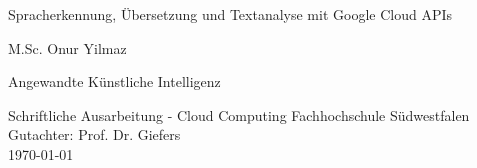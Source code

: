 \documentclass[12pt,a4paper]{article}
\begin{document}
	
		
		\begin{titlepage}
			\begin{center}
				\vspace*{1cm}
				\Huge
				Spracherkennung, Übersetzung und Textanalyse mit Google Cloud APIs
				
				
				\vspace{1.5cm}
				\LARGE
				M.Sc. Onur Yilmaz
				
				\vspace{1.5cm}
				\Large
				Angewandte Künstliche Intelligenz
				
				\vfill
				
				Schriftliche Ausarbeitung - Cloud Computing
				\vspace{0.5cm}
				\large
				Fachhochschule Südwestfalen
				\vspace{0.8cm}
				\Large
				\\
				Gutachter: Prof. Dr. Giefers
				\\
				\vspace{0.5cm}
				\large		
				\today
			\end{center}
		\end{titlepage}

\thispagestyle{empty}
\tableofcontents

\newpage
\end{document}
